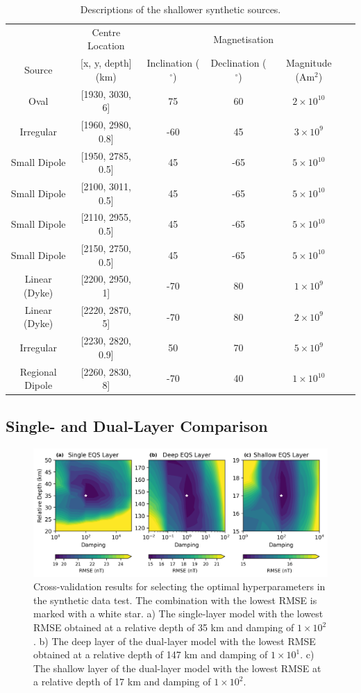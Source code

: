 \begin{table}[tb!]
\centering
\begin{tabular}{c c c c c c}
\toprule
 & Centre Location & \multicolumn{3}{c}{Magnetisation} \\
\cmidrule(lr){2-2} \cmidrule(lr){3-5}
Source & [x, y, depth] (km) & Inclination ($^\circ$) & Declination ($^\circ$) & Magnitude (Am$^2$) \\
\midrule
Oval & [1930, 3030, 6] & 75 & 60 & $2 \times 10^{10}$ \\
Irregular & [1960, 2980, 0.8] & -60 & 45 & $3 \times 10^{9}$ \\
Small Dipole & [1950, 2785, 0.5] & 45 & -65 & $5 \times 10^{10}$ \\
Small Dipole	& [2100, 3011, 0.5] & 45 & -65 & $5 \times 10^{10}$ \\
Small Dipole & [2110, 2955, 0.5] & 45 & -65 & $5 \times 10^{10}$ \\
Small Dipole & [2150, 2750, 0.5] & 45 & -65 & $5 \times 10^{10}$ \\
Linear (Dyke) & [2200, 2950, 1] & -70 & 80 & $1 \times 10^{9}$ \\
Linear (Dyke) & [2220, 2870, 5] & -70 & 80 & $2 \times 10^{9}$ \\
Irregular & [2230, 2820, 0.9] & 50 & 70 & $5 \times 10^{9}$ \\
Regional Dipole & [2260, 2830, 8] & -70 & 40 & $1 \times 10^{10}$ \\
\bottomrule
\end{tabular}
\caption{Descriptions of the shallower synthetic sources.}
\label{table:shallow_sources}
\end{table}

\subsection{Single- and Dual-Layer Comparison}
\label{sec:single_vs_dual}

\begin{figure}[tb!]
\centering
\includegraphics[width=1\linewidth]{figures/cv_synthetic.png}
\caption{
    Cross-validation results for selecting the optimal hyperparameters in the synthetic data test. The combination with the lowest RMSE is marked with a white star. a) The single-layer model with the lowest RMSE obtained at a relative depth of 35 km and damping of $1 \times 10^2$. b) The deep layer of the dual-layer model with the lowest RMSE obtained at a relative depth of 147 km and damping of $1 \times 10^1$. c) The shallow layer of the dual-layer model with the lowest RMSE at a relative depth of 17 km and damping of $1 \times 10^2$.
}
\label{fig:cv_synthetic}
\end{figure}

